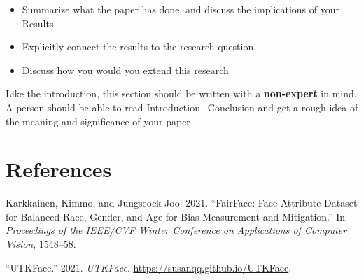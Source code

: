 \documentclass[
  letterpaper,
  DIV=11,
  numbers=noendperiod]{scrreprt}
\newlength{\cslhangindent}
\newlength{\cslentryspacingunit} %
\newenvironment{CSLReferences}[2] %
 {%
  \setlength{\parindent}{0pt}
  \ifodd #1
  \let\oldpar\par
  \def\par{\hangindent=\cslhangindent\oldpar}
  \fi
  \setlength{\parskip}{#2\cslentryspacingunit}
 }%
 {}
\begin{document}
\begin{tcolorbox}[enhanced jigsaw, bottomrule=.15mm, left=2mm, bottomtitle=1mm, leftrule=.75mm, coltitle=black, toprule=.15mm, breakable, opacitybacktitle=0.6, titlerule=0mm, colback=white, colbacktitle=quarto-callout-note-color!10!white, toptitle=1mm, arc=.35mm, rightrule=.15mm, colframe=quarto-callout-note-color-frame, opacityback=0, title=\textcolor{quarto-callout-note-color}{\faInfo}\hspace{0.5em}{From the report requirements}]

\begin{itemize}
\item
  Summarize what the paper has done, and discuss the implications of
  your Results.
\item
  Explicitly connect the results to the research question.
\item
  Discuss how you would you extend this research
\end{itemize}

Like the introduction, this section should be written with a
\textbf{non-expert} in mind. A person should be able to read
Introduction+Conclusion and get a rough idea of the meaning and
significance of your paper

\end{tcolorbox}


\hypertarget{references}{%
\chapter*{References}\label{references}}


\hypertarget{refs}{}
\begin{CSLReferences}{1}{0}
\leavevmode{}%
Karkkainen, Kimmo, and Jungseock Joo. 2021. {``FairFace: Face Attribute
Dataset for Balanced Race, Gender, and Age for Bias Measurement and
Mitigation.''} In \emph{Proceedings of the IEEE/CVF Winter Conference on
Applications of Computer Vision}, 1548--58.

\leavevmode{}%
{``{UTKFace}.''} 2021. \emph{UTKFace}.
\url{https://susanqq.github.io/UTKFace}.

\end{CSLReferences}
\end{document}
